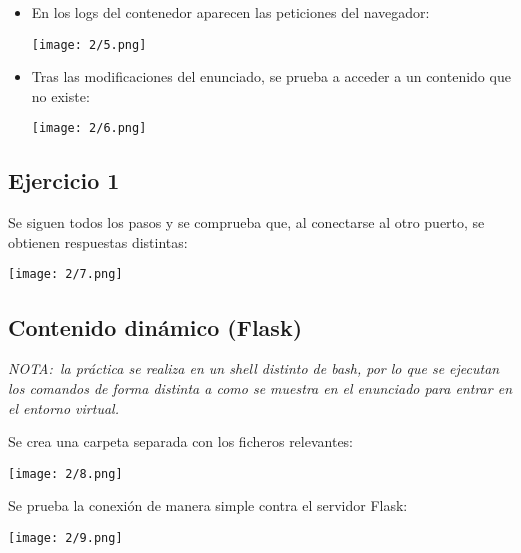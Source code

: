 \begin{itemize}
	\item En los logs del contenedor aparecen las peticiones del navegador: \\
		\begin{minipage}{\linewidth}
			\centering
			\texttt{[image: 2/5.png]}
			\label{fig:2/5}
		\end{minipage}
	\item Tras las modificaciones del enunciado, se prueba a acceder a un contenido
		que no existe: \\
		\begin{minipage}{\linewidth}
			\centering
			\texttt{[image: 2/6.png]}
			\label{fig:2/6}
		\end{minipage}
\end{itemize}
\subsection{Ejercicio 1}
Se siguen todos los pasos y se comprueba que, al conectarse al otro puerto, se obtienen
respuestas distintas: \\
\begin{minipage}{\linewidth}
	\centering
	\texttt{[image: 2/7.png]}
	\label{fig:2/7}
\end{minipage}

\subsection{Contenido dinámico (Flask)}
\textit{NOTA:~la práctica se realiza en un shell distinto de bash, por lo que se ejecutan
	los comandos de forma distinta a como se muestra en el enunciado para entrar en el
	entorno virtual.}

Se crea una carpeta separada con los ficheros relevantes: \\
\begin{minipage}{\linewidth}
	\centering
	\texttt{[image: 2/8.png]}
	\label{fig:2/8}
\end{minipage}

Se prueba la conexión de manera simple contra el servidor Flask: \\
\begin{minipage}{\linewidth}
	\centering
	\texttt{[image: 2/9.png]}
	\label{fig:2/9}
\end{minipage}

